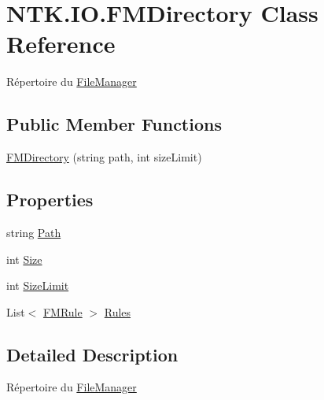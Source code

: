 \hypertarget{class_n_t_k_1_1_i_o_1_1_f_m_directory}{}\section{N\+T\+K.\+I\+O.\+F\+M\+Directory Class Reference}
\label{class_n_t_k_1_1_i_o_1_1_f_m_directory}


Répertoire du \mbox{\hyperlink{class_n_t_k_1_1_i_o_1_1_file_manager}{File\+Manager}}  


\subsection*{Public Member Functions}
\begin{DoxyCompactItemize}
\item 
\mbox{\hyperlink{class_n_t_k_1_1_i_o_1_1_f_m_directory_a3ccd7f230287b70755f76961cf63abd0}{F\+M\+Directory}} (string path, int size\+Limit)
\end{DoxyCompactItemize}
\subsection*{Properties}
\begin{DoxyCompactItemize}
\item 
string \mbox{\hyperlink{class_n_t_k_1_1_i_o_1_1_f_m_directory_a5d12c47469328064bbdf5a0fc1fbbe3d}{Path}}
\item 
int \mbox{\hyperlink{class_n_t_k_1_1_i_o_1_1_f_m_directory_a9c97224fd4d643df3be017bacd655bc0}{Size}}
\item 
int \mbox{\hyperlink{class_n_t_k_1_1_i_o_1_1_f_m_directory_abcb565f98a1b1028ef742623036db062}{Size\+Limit}}
\item 
List$<$ \mbox{\hyperlink{class_n_t_k_1_1_i_o_1_1_f_m_rule}{F\+M\+Rule}} $>$ \mbox{\hyperlink{class_n_t_k_1_1_i_o_1_1_f_m_directory_af579e225097ee830866581a00a406400}{Rules}}
\end{DoxyCompactItemize}


\subsection{Detailed Description}
Répertoire du \mbox{\hyperlink{class_n_t_k_1_1_i_o_1_1_file_manager}{File\+Manager}} 



